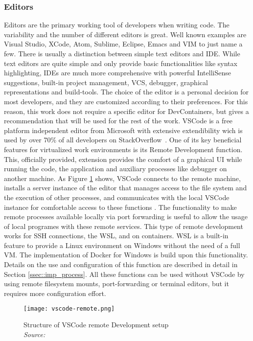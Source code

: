 \documentclass[12pt, a4paper]{article}
\begin{document}
        \subsubsection{Editors}
        Editors are the primary working tool of developers when writing code. The variability and the number of different editors is great. Well known examples are Visual Studio, XCode, Atom, Sublime, Eclipse, Emacs and VIM to just name a few. There is usually a distinction between simple text editors and \acl{IDE}. While text editors are quite simple and only provide basic functionalities like syntax highlighting, \ac{IDE}s are much more comprehensive with powerful IntelliSense suggestions, built-in project management, \ac{VCS}, debugger, graphical representations and build-tools. The choice of the editor is a personal decision for most developers, and they are customized according to their preferences. For this reason, this work does not require a specific editor for DevContainers, but gives a recommendation that will be used for the rest of the work.\newline
        \ac{VSCode} is a free platform independent editor from Microsoft with extensive extendibility wich is used by over 70\% of all developers on StackOverflow~\cite{stackoverflow2021}. One of its key beneficial features for virtualized work environments is its Remote Development function. This, officially provided, extension provides the comfort of a graphical \ac{UI} while running the code, the application and auxiliary processes like debugger on another machine. As Figure \ref{fig::vscoderemote} shows, \ac{VSCode} connects to the remote machine, installs a server instance of the editor that manages access to the file system and the execution of other processes, and communicates with the local \ac{VSCode} instance for comfortable access to these functions \cite{vscodedevcontainer}. The functionality to make remote processes available locally via port forwarding is useful to allow the usage of local programes with these remote services. This type of remote development works for \acs{SSH} connections, the \ac{WSL}, and on containers. \ac{WSL} is a built-in feature to provide a Linux environment on Windows without the need of a full \ac{VM}. The implementation of Docker for Windows is build upon this functionality. Details on the use and configuration of this function are described in detail in Section \ref{ssec::imp_process}. All these functions can be used without \ac{VSCode} by using remote filesystem mounts, port-forwarding or terminal editors, but it requires more configuration effort.
        \begin{figure}[]
            \centering
            \texttt{[image: vscode-remote.png]}
            \caption{Structure of \ac{VSCode} remote Development setup \\\textit{Source:~\cite{vscodedevcontainer}}}\label{fig::vscoderemote}
        \end{figure}
\end{document}
